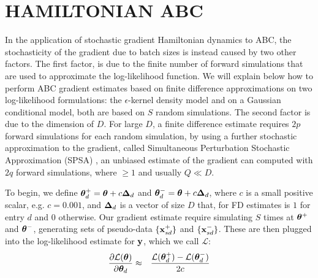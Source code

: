 \documentclass[]{article}
\begin{document}
\section{HAMILTONIAN ABC}\label{sec:habc}
In the application of stochastic gradient Hamiltonian dynamics to ABC, the stochasticity of the gradient due to batch sizes is instead caused by two other factors.  The first factor, is due to the finite number of forward simulations that are used to approximate the log-likelihood function.  We will explain below how to perform ABC gradient estimates based on finite difference approximations on two log-likelihood formulations: the $\epsilon$-kernel density model and on a Gaussian conditional model, both are based on $S$ random simulations.  The second factor is due to the dimension of $D$.  For large $D$, a finite difference estimate requires $2p$ forward simulations for each random simulation, by using a further stochastic approximation to the gradient, called Simultaneous Perturbation Stochastic Approximation (SPSA) \cite{spall}, an unbiased estimate of the gradient can computed with $2q$ forward simulations, where $ \geq 1$ and usually $Q \ll D$.

To begin, we define ${\bm \theta}^{+}_d = {\bm \theta} + c {\bm \Delta}_d$ and ${\bm \theta}^{-}_d = {\bm \theta} + c {\bm \Delta}_d$, where $c$ is a small positive scalar, e.g. $c=0.001$, and ${\bm \Delta}_d$ is a vector of size $D$ that, for FD estimates is $1$ for entry $d$ and $0$ otherwise.  Our gradient estimate require simulating $S$ times at ${\bm \theta}^{+}$ and ${\bm \theta}^{-}$, generating sets of pseudo-data $\{ {\bf x}^{+}_{sd} \}$ and $\{ {\bf x}^{-}_{sd} \}$.  These are then plugged into the log-likelihood estimate for ${\bf y}$, which we call $\mathcal{L}$:
\begin{eqnarray}
  \frac{\partial \mathcal{L}({\bm \theta})}{\partial {\bm \theta}_d} & \approx & \frac{\mathcal{L}({\bm \theta}^{+}_d)- \mathcal{L}({\bm \theta}^{-}_d)}{2c}
\end{eqnarray}
\end{document}
